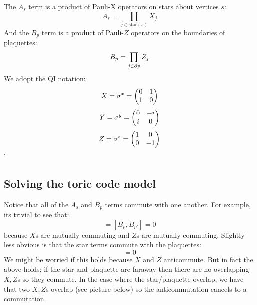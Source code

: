The $A_s$ term is a product of Pauli-X operators on stars about vertices $s$:
\begin{equation}
    A_s = \prod_{j \in \text{star}(s)} X_j
\end{equation}
And the $B_p$ term is a product of Pauli-$Z$ operators on the boundaries of plaquettes:
\begin{equation}
    B_p = \prod_{j \in \partial p}Z_j
\end{equation}
We adopt the QI notation:
\begin{equation}
    X = \sigma^x = \begin{pmatrix} 0 & 1 \\ 1 & 0 \end{pmatrix}
\end{equation}
\begin{equation}
    Y = \sigma^y = \begin{pmatrix} 0 & -i \\ i & 0 \end{pmatrix}
\end{equation}
\begin{equation}
    Z = \sigma^z = \begin{pmatrix} 1 & 0 \\ 0 & -1 \end{pmatrix}
\end{equation}'

\subsection{Solving the toric code model}
Notice that all of the $A_s$ and $B_p$ terms commute with one another. For example, its trivial to see that:
\begin{equation}
    [A_s, A_{s'}] = [B_p, B_{p'}] = 0
\end{equation}
because $X$s are mutually commuting and $Z$s are mutually commuting. Slightly less obvious is that the star terms commute with the plaquettes:
\begin{equation}
    [A_s, B_p] = 0
\end{equation}
We might be worried if this holds because $X$ and $Z$ anticommute. But in fact the above holds; if the star and plaquette are faraway then there are no overlapping $X, Z$s so they commute. In the case where the star/plaquette overlap, we have that two $X, Z$s overlap (see picture below) so the anticommutation cancels to a commutation.

